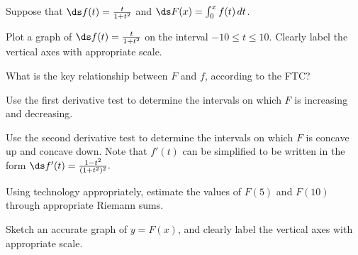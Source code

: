 

\begin{activity} \label{A:5.2.2}  Suppose that $\ds f(t) = \frac{t}{1+t^2}$ and $\ds F(x) = \int_0^x f(t) \, dt$.

\ba
\item Plot a graph of $\ds f(t) = \frac{t}{1+t^2}$ on the interval $-10 \le t \le 10$.  Clearly label the vertical axes with appropriate scale.

\item What is the key relationship between $F$ and $f$, according to the FTC?

\item Use the first derivative test to determine the intervals on which $F$ is increasing and decreasing.

\item Use the second derivative test to determine the intervals on which $F$ is concave up and concave down.  Note that $f'(t)$ can be simplified to be written in the form $\ds f'(t) = \frac{1-t^2}{(1+t^2)^2}.$

\item Using technology appropriately, estimate the values of $F(5)$ and $F(10)$ through appropriate Riemann sums.

\item Sketch an accurate graph of $y = F(x)$, and clearly label the vertical axes with appropriate scale.
\ea
\end{activity}


